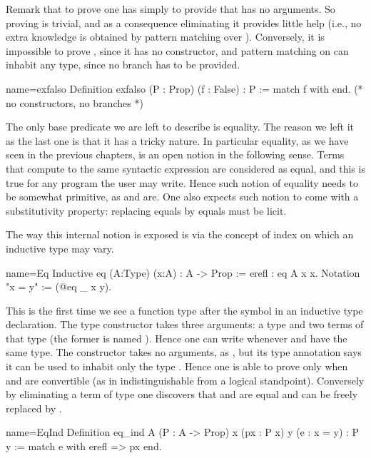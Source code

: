 Remark that to prove  one has simply to provide  that has no
arguments.  So proving  is trivial, and as a consequence eliminating it
provides little help (i.e., no extra knowledge is obtained by pattern matching
over ).  Conversely, it is impossible to prove , since it has no
constructor, and pattern matching on  can inhabit any type, since no
branch has to be provided.

\begin{coq}{name=exfalso}{}
Definition exfalso (P : Prop) (f : False) : P :=
  match f with end.  (* no constructors, no branches *)
\end{coq}

The only base predicate we are left to describe is equality.  The reason we
left it as the last one is that it has a tricky nature.  In particular
equality, as we have seen in the previous chapters, is an open notion
in the following sense.  Terms that compute to the same syntactic expression
are considered as equal, and this is true for any program the user may write.
Hence such notion of equality needs to be somewhat primitive, as
 and  are.  One also expects such notion to come
with a substitutivity property: replacing equals by equals must be licit.

The way this internal notion is exposed is via the concept of index
on which an inductive type may vary.

\begin{coq}{name=Eq}{}
Inductive eq (A:Type) (x:A) : A -> Prop := erefl : eq A x x.
Notation "x = y" := (@eq _ x y).
\end{coq}

This is the first time we see a function type after the \C{:} symbol
in an inductive type declaration.
The  type constructor takes three arguments: a type  and
two terms of that type (the former is named ).
Hence one can write  whenever  and 
have the same type.
The  constructor takes no arguments, as , but its type
annotation says it can be used to inhabit only the type .
Hence one is able to prove  only when  and  are
convertible
(as in indistinguishable from a logical standpoint).
Conversely by eliminating a term
of type  one discovers that   and  are
equal and  can be freely replaced by .

\begin{coq}{name=EqInd}{}
Definition eq_ind A (P : A -> Prop) x (px : P x) y (e : x = y) : P y :=
  match e with erefl => px end.
\end{coq}

